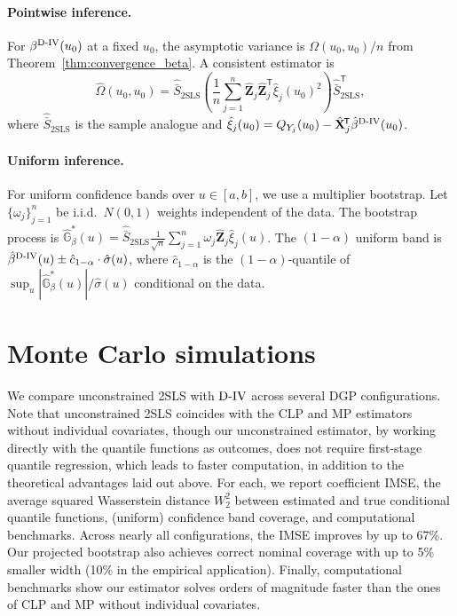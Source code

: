\documentclass[12pt]{article}
\newcommand{\T}{\mathsf{T}} %
\newcommand{\est}{\ensuremath{\textnormal{D-IV}}\xspace}
\newcommand{\CLP}{CLP\xspace}
\newcommand{\MP}{MP\xspace}
\begin{document}
\paragraph{Pointwise inference.} For $\beta^{\est}(u_0)$ at a fixed $u_0$, the asymptotic variance is $\Omega(u_0, u_0)/n$ from Theorem~\ref{thm:convergence_beta}. A consistent estimator is
\[
\hat{\Omega}(u_0, u_0) = \hat{\bar{S}}_{\mathrm{2SLS}} \left(\frac{1}{n}\sum_{j=1}^n \hat{\mathbf{Z}}_j \hat{\mathbf{Z}}_j^{\!\T} \hat{\xi}_j(u_0)^2\right) \hat{\bar{S}}_{\mathrm{2SLS}}^{\!\T},
\]
where $\hat{\bar{S}}_{\mathrm{2SLS}}$ is the sample analogue and $\hat{\xi}_j(u_0) = Q_{Y_j}(u_0) - \hat{\mathbf{X}}_j^{\!\T}\hat{\beta}^{\est}(u_0)$.

\paragraph{Uniform inference.} For uniform confidence bands over $u \in [a,b]$, we use a multiplier bootstrap. Let $\{\omega_j\}_{j=1}^n$ be i.i.d.\ $N(0,1)$ weights independent of the data. The bootstrap process is $\hat{\mathbb{G}}_\beta^*(u) = \hat{\bar{S}}_{\mathrm{2SLS}} \frac{1}{\sqrt{n}}\sum_{j=1}^n \omega_j \hat{\mathbf{Z}}_j \hat{\xi}_j(u)$. The $(1-\alpha)$ uniform band is $\hat{\beta}^{\est}(u) \pm \hat{c}_{1-\alpha} \cdot \hat{\sigma}(u)$, where $\hat{c}_{1-\alpha}$ is the $(1-\alpha)$-quantile of $\sup_u |\hat{\mathbb{G}}_\beta^*(u)| / \hat{\sigma}(u)$ conditional on the data.


\section{Monte Carlo simulations}
\label{sec:simulation}

We compare unconstrained 2SLS with \est across several DGP configurations. Note that unconstrained 2SLS coincides with the \CLP and \MP estimators without individual covariates, though our unconstrained estimator, by working directly with the quantile functions as outcomes, does not require first-stage quantile regression, which leads to faster computation, in addition to the theoretical advantages laid out above. For each, we report coefficient IMSE, the average squared Wasserstein distance $W_2^2$ between estimated and true conditional quantile functions, (uniform) confidence band coverage, and computational benchmarks. Across nearly all configurations, the IMSE improves by up to 67\%. Our projected bootstrap also achieves correct nominal coverage with up to 5\% smaller width (10\% in the empirical application). Finally, computational benchmarks show our estimator solves orders of magnitude faster than the ones of \CLP and \MP without individual covariates. 
\end{document}
